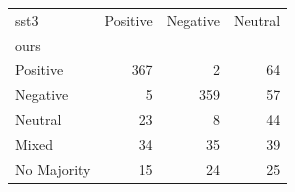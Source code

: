 \begin{tabular}{lrrr}
\toprule
sst3 &  Positive &  Negative &  Neutral \\
ours        &           &           &          \\
\midrule
Positive    &       367 &         2 &       64 \\
Negative    &         5 &       359 &       57 \\
Neutral     &        23 &         8 &       44 \\
Mixed       &        34 &        35 &       39 \\
No Majority &        15 &        24 &       25 \\
\bottomrule
\end{tabular}
